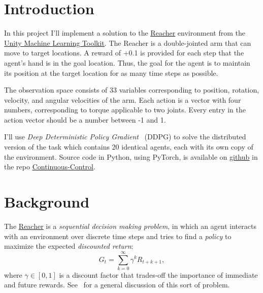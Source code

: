 \documentclass[sigchi]{acmart}
\begin{document}
\section{Introduction}

In this project I'll implement a solution to the 
\href{https://github.com/Unity-Technologies/ml-agents/blob/master/docs/Learning-Environment-Examples.md#reacher}{\underline{Reacher}}
environment from the 
\href{https://unity3d.ai}{\underline{Unity Machine Learning Toolkit}}.
The Reacher is a double-jointed arm that can move to target locations. A reward of +0.1 is provided for each step 
that the agent's hand is in the goal location. Thus, the goal for the agent is to maintain its position at the target location for as many time steps as possible.

The observation space consists of 33 variables corresponding to position, rotation, velocity, and angular velocities of the arm. Each action is a vector with four numbers, corresponding to torque applicable to two joints. Every entry in the action vector should be a number between -1 and 1.


I'll use {\em Deep Deterministic Policy Gradient}~\cite{Silver:2014:DPG:3044805.3044850} (DDPG) to solve the distributed version of the task which contains 20 identical agents, each with its own copy of the environment.
Source code in Python, using PyTorch, is available on 
\href{http://github.com}{\underline{github}} 
in the repo 
\href{https://github.com/bobflagg/Continuous-Control}{\underline{Continuous-Control}}.





\section{Background}

The 
\href{https://github.com/Unity-Technologies/ml-agents/blob/master/docs/Learning-Environment-Examples.md#reacher}{\underline{Reacher}}
is a {\em sequential decision making problem}, in which an agent interacts with an environment over discrete time
steps and tries to find a {\em policy} to maximize the expected {\em discounted return}:
$$G_t = \sum_{k=0}^{\infty}\gamma^kR_{t+k+1},$$
where $\gamma\in[0,1]$  is a discount factor that trades-off the importance of immediate and future rewards.
See~\cite{DBLP:books/lib/SuttonB98} for a general discussion of this sort of problem. 
\end{document}
